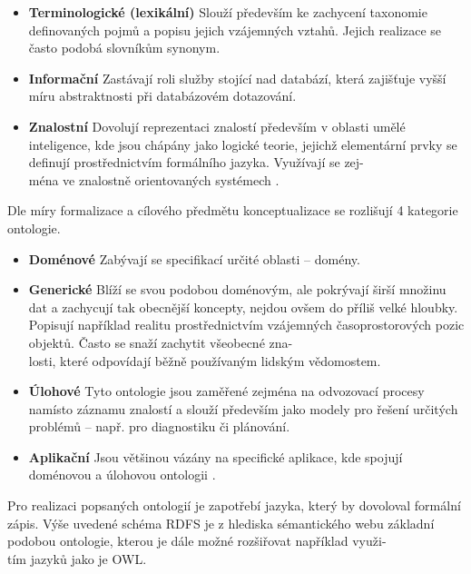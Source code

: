 \documentclass{projekt}
\begin{document}
\begin {itemize}

\item \textbf{Terminologické (lexikální)} Slouží především ke zachycení taxonomie definovaných pojmů a popisu jejich vzájemných vztahů. Jejich realizace se často podobá slovníkům synonym.
\item \textbf{Informační} Zastávají roli služby stojící nad databází, která zajišťuje vyšší míru abstraktnosti při databázovém dotazování.
\item \textbf{Znalostní} Dovolují reprezentaci znalostí především v oblasti umělé inteligence, kde jsou chápány jako logické teorie, jejichž elementární prvky se definují prostřednictvím formálního jazyka. Využívají se zej-\\ména ve znalostně orientovaných systémech \cite{_10}.

\end{itemize}

Dle míry formalizace a cílového předmětu konceptualizace se rozlišují 4 kategorie ontologie.

\begin {itemize}

\item \textbf{Doménové} Zabývají se specifikací určité oblasti – domény.
\item \textbf{Generické} Blíží se svou podobou doménovým, ale pokrývají širší množinu dat a zachycují tak obecnější koncepty, nejdou ovšem do příliš velké hloubky. Popisují například realitu prostřednictvím vzájemných časoprostorových pozic objektů. Často se snaží zachytit všeobecné zna-\\losti, které odpovídají běžně používaným lidským vědomostem.
\item \textbf{Úlohové} Tyto ontologie jsou zaměřené zejména na odvozovací procesy namísto záznamu znalostí a slouží především jako modely pro řešení určitých problémů – např. pro diagnostiku či plánování.
\item \textbf{Aplikační} Jsou většinou vázány na specifické aplikace, kde spojují doménovou a úlohovou ontologii \cite{_10}.
\end{itemize}

Pro realizaci popsaných ontologií je zapotřebí jazyka, který by dovoloval formální zápis. Výše uvedené schéma RDFS je z hlediska sémantického webu základní podobou ontologie, kterou je dále možné rozšiřovat například využi-\\tím jazyků jako je OWL.
\end{document}
